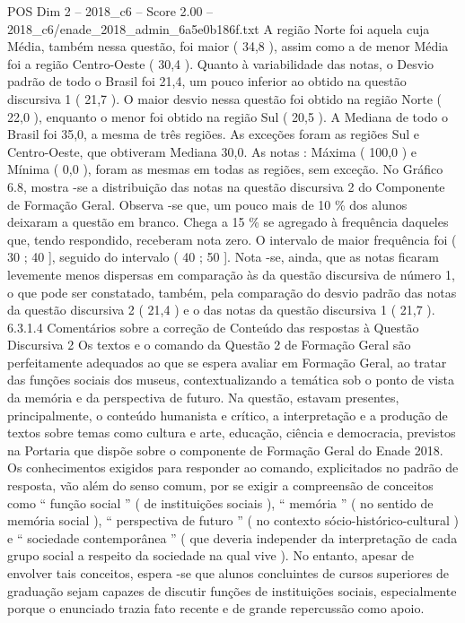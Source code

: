 \begin{textsample}{POS Dim 2 – 2018\_c6 – Score 2.00 – 2018\_c6/enade\_2018\_admin\_6a5e0b186f.txt}
A região Norte foi aquela cuja Média, também nessa questão, foi maior ( 34,8 ), assim como a de menor Média foi a região Centro-Oeste ( 30,4 ).
Quanto à variabilidade das notas, o Desvio padrão de todo o Brasil foi 21,4, um pouco inferior ao obtido na questão discursiva 1 ( 21,7 ).
O maior desvio nessa questão foi obtido na região Norte ( 22,0 ), enquanto o menor foi obtido na região Sul ( 20,5 ).
A Mediana de todo o Brasil foi 35,0, a mesma de três regiões.
As exceções foram as regiões Sul e Centro-Oeste, que obtiveram Mediana 30,0.
As notas : Máxima ( 100,0 ) e Mínima ( 0,0 ), foram as mesmas em todas as regiões, sem exceção.
No Gráfico 6.8, mostra -se a distribuição das notas na questão discursiva 2 do Componente de Formação Geral.
Observa -se que, um pouco mais de 10 \% dos alunos deixaram a questão em branco.
Chega a 15 \% se agregado à frequência daqueles que, tendo respondido, receberam nota zero.
O intervalo de maior frequência foi ( 30 ; 40 ], seguido do intervalo ( 40 ; 50 ].
Nota -se, ainda, que as notas ficaram levemente menos dispersas em comparação às da questão discursiva de número 1, o que pode ser constatado, também, pela comparação do desvio padrão das notas da questão discursiva 2 ( 21,4 ) e o das notas da questão discursiva 1 ( 21,7 ). 6.3.1.4 Comentários sobre a correção de Conteúdo das respostas à Questão Discursiva 2 Os textos e o comando da Questão 2 de Formação Geral são perfeitamente adequados ao que se espera avaliar em Formação Geral, ao tratar das funções sociais dos museus, contextualizando a temática sob o ponto de vista da memória e da perspectiva de futuro.
Na questão, estavam presentes, principalmente, o conteúdo humanista e crítico, a interpretação e a produção de textos sobre temas como cultura e arte, educação, ciência e democracia, previstos na Portaria que dispõe sobre o componente de Formação Geral do Enade 2018.
Os conhecimentos exigidos para responder ao comando, explicitados no padrão de resposta, vão além do senso comum, por se exigir a compreensão de conceitos como “ função social ” ( de instituições sociais ), “ memória ” ( no sentido de memória social ), “ perspectiva de futuro ” ( no contexto sócio-histórico-cultural ) e “ sociedade contemporânea ” ( que deveria independer da interpretação de cada grupo social a respeito da sociedade na qual vive ).
No entanto, apesar de envolver tais conceitos, espera -se que alunos concluintes de cursos superiores de graduação sejam capazes de discutir funções de instituições sociais, especialmente porque o enunciado trazia fato recente e de grande repercussão como apoio.

\end{textsample}

